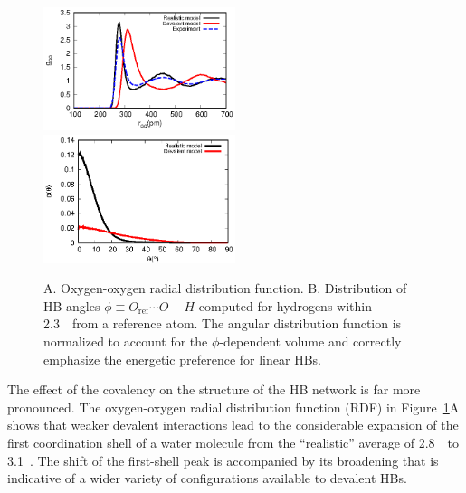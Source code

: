 \documentclass[aps,prl,reprint,amsmath,amssymb]{revtex4-1}
\begin{document}
\begin{figure}
\includegraphics[width=0.5\textwidth]{new_rdf}
\includegraphics[width=0.5\textwidth]{new_adf}
\caption{A. Oxygen-oxygen radial distribution function. B. Distribution of HB angles $\phi \equiv O_{\text{ref}} \cdots O-H$ computed for hydrogens within 2.3~\Ang\ from a reference atom. The angular distribution function is normalized to account for the $\phi$-dependent volume and correctly emphasize the energetic preference for linear HBs.} \label{Fig:RDF}
\end{figure}


The effect of the covalency on the structure of the HB network is far more pronounced. 
The oxygen-oxygen radial distribution function (RDF) in Figure~\ref{Fig:RDF}A shows that weaker devalent interactions lead to the considerable expansion of the first coordination shell of a water molecule from the ``realistic'' average of 2.8~\Ang\ to 3.1~\Ang. 
The shift of the first-shell peak is accompanied by its broadening that is indicative of a wider variety of configurations available to devalent HBs.
\end{document}
